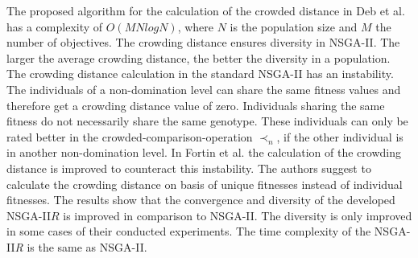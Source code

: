     The proposed algorithm for the calculation of the crowded distance in Deb et al.\cite{Deb:2002} has a complexity of $O(MN logN)$, where $N$ is the population size and $M$ the number of objectives. The crowding distance ensures diversity in NSGA-II. The larger the average crowding distance, the better the diversity in a population.\\
    \newline
    The crowding distance calculation in the standard NSGA-II\cite{Deb:2002} has an instability. The individuals of a non-domination level can share the same fitness values and therefore get a crowding distance value of zero. Individuals sharing the same fitness do not necessarily share the same genotype. These individuals can only be rated better in the crowded-comparison-operation $\prec_n$, if the other individual is in another non-domination level. In Fortin et al.\cite{Fortin:2013} the calculation of the crowding distance is improved to counteract this instability. The authors suggest to calculate the crowding distance on basis of unique fitnesses instead of individual fitnesses. The results show that the convergence and diversity of the developed NSGA-II$R$ is improved in comparison to NSGA-II. The diversity is only improved in some cases of their conducted experiments. The time complexity of the NSGA-II\textit{R} is the same as NSGA-II.
    
